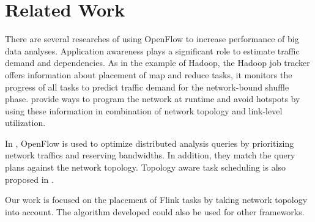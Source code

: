 \section{Related Work}
There are several researches of using OpenFlow to increase performance of big data analyses.
Application awareness plays a significant role to estimate traffic demand and dependencies. As in
the example of Hadoop, the Hadoop job tracker offers information about placement of map and reduce
tasks, it monitors the progress of all tasks to predict traffic demand for the network-bound shuffle
phase. \cite{programmingatruntime} \cite {pythia} provide ways to program the network at runtime and
avoid hotspots by using these information in combination of network topology and link-level
utilization.

In \cite{query}, OpenFlow is used to optimize distributed analysis queries by prioritizing network
traffics and reserving bandwidths. In addition, they match the query plans against the network
topology.  Topology aware task scheduling is also proposed in \cite{programmingatruntime}.

Our work is focused on the placement of Flink tasks by taking network topology into account. The
algorithm developed could also be used for other frameworks.

